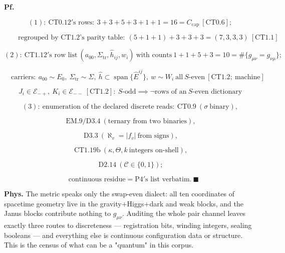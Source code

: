 \begin{theorem}
\textbf{Pf.}

\[
(1):\ \mathrm{CT0.12}'\text{s rows}:\ 3{+}3{+}5{+}3{+}1{+}1=16=C_{\mathrm{cap}}\ [\mathrm{CT0.6}];
\]

\[
\qquad \text{regrouped by CT1.2's parity table}:\ (5{+}1{+}1){+}3{+}3{+}3=(7,3,3,3)\ [\mathrm{CT1.1}]
\]

\[
(2):\ \mathrm{CT1.12}'\text{s row list}\ (a_{00},\Sigma_{\mathrm{tr}},\hat h_{ij},w_i)\ \text{with counts}\ 1{+}1{+}5{+}3=10=\#\{g_{\mu\nu}=g_{\nu\mu}\};
\]

\[
\quad \text{carriers}:\ a_{00}\sim E_0,\ \Sigma_{\mathrm{tr}}\sim\Sigma,\ \hat h\subset\operatorname{span}\{\hat E^{ij}\},\ w\sim W_i\ \text{all}\ S\text{-even}\ [\mathrm{CT1.2};\ \text{machine}]
\]

\[
J_i\in\mathcal E_{-+},\ K_i\in\mathcal E_{--}\ [\mathrm{CT1.2}]:\ S\text{-odd}\implies\neg\text{rows of an}\ S\text{-even dictionary}
\]

\[
(3):\ \text{enumeration of the declared discrete reads}:\ \mathrm{CT0.9}\ (\sigma\ \text{binary}),
\]

\[
\ \mathrm{EM.9}/\mathrm{D3.4}\ (\text{ternary from two binaries}),
\]

\[
\ \mathrm{D3.3}\ (\aleph_v=|f_v|\ \text{from signs}),
\]

\[
\ \mathrm{CT1.19b}\ (\kappa,\Theta,k\ \text{integers on-shell}),
\]

\[
\ \mathrm{D2.14}\ (\mathcal C\in\{0,1\});
\]

\[
\quad \text{continuous residue}=\mathrm{P4}'\text{s list verbatim}.\ \blacksquare
\]

\textbf{Phys.} The metric speaks only the swap-even dialect: all ten coordinates of spacetime geometry live in the gravity$+$Higgs$+$dark and weak blocks, and the Janus blocks contribute nothing to $g_{\mu\nu}$. Auditing the whole pair channel leaves exactly three routes to discreteness — registration bits, winding integers, sealing booleans — and everything else is continuous configuration data or structure. This is the census of what can be a "quantum" in this corpus.

\end{theorem}

